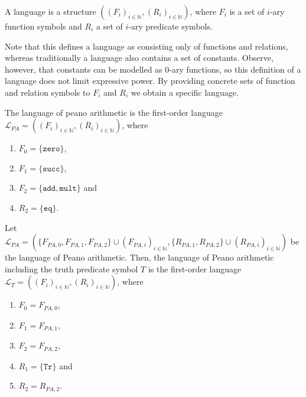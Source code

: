 \begin{definition}\label{def:FO-language}
    \leanok
    A language is a structure $((F_i)_{i\in \mathbb{N}}, (R_i)_{i\in \mathbb{N}})$, where $F_i$ is a set of $i$-ary function symbols and $R_i$ a set of $i$-ary predicate symbols.
\end{definition}

Note that this defines a language as consisting only of functions and relations, whereas traditionally a language also contains a set of constants. Observe, however, that constants can be modelled as $0$-ary functions, so this definition of a language does not limit expressive power. By providing concrete sets of function and relation symbols to $F_i$ and $R_i$ we obtain a specific language.

\begin{definition}\label{def:LPA}
    \leanok
    The language of peano arithmetic is the first-order language $\mathcal{L}_{PA} = ((F_i)_{i \in \mathbb{N}}, (R_i)_{i \in \mathbb{N}})$, where
    \begin{enumerate}
        \item $F_0 = \{\texttt{zero}\}$,
        \item $F_1 = \{\texttt{succ}\}$,
        \item $F_2 = \{\texttt{add},\texttt{mult}\}$ and
        \item $R_2 = \{\texttt{eq}\}$.
    \end{enumerate}
\end{definition} 

\begin{definition}\label{def:LTr}
    \leanok
    Let $\mathcal{L}_{PA} = (\{F_{PA,0}, F_{PA,1}, F_{PA,2}\} \cup (F_{PA,i})_{i \in \mathbb{N}}, \{R_{PA,1}, R_{PA,2}\} \cup (R_{PA,i})_{i \in \mathbb{N}})$ be the language of Peano arithmetic. Then, the language of Peano arithmetic including the truth predicate symbol $T$ is the first-order language $\mathcal{L}_T = ((F_i)_{i \in \mathbb{N}}, (R_i)_{i \in \mathbb{N}})$, where
    \begin{enumerate}
        \item $F_0 = F_{PA,0}$,
        \item $F_1 = F_{PA,1}$,
        \item $F_2 = F_{PA,2}$,
        \item $R_1 = \{\texttt{Tr}\}$ and
        \item $R_2 = R_{PA,2}$.
    \end{enumerate}
\end{definition}

